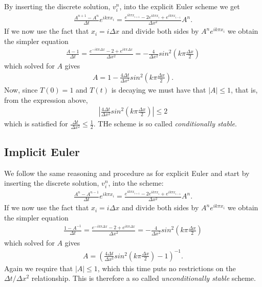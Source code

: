 \documentclass[11pt,a4paper,draft]{article}
\numberwithin{equation}{section}
\begin{document}
By inserting the discrete solution, $v^n_i$, into the explicit Euler scheme we get
\begin{align*}
\frac{A^{n+1}-A^{n}}{\Delta t} e^{ik \pi x_i} = \frac{e^{ik \pi x_{i+1}} -2e^{ik \pi x_i} + e^{ik \pi x_{i-1}}}{\Delta x^2} A^n.
\end{align*}
If we now use the fact that $x_i = i\Delta x$ and divide both sides by $A^n e^{ik \pi x_i}$ we obtain the simpler equation
\begin{align*}
\frac{A-1}{\Delta t} = \frac{e^{-ik \pi \Delta x} -2 + e^{ik \pi \Delta x}}{\Delta x^2} = -\frac{4}{\Delta x^2}sin^2\left(k\pi \frac{\Delta x}{2}\right)
\end{align*}
which solved for $A$ gives
\begin{align*}
A=1-\frac{4\Delta t}{\Delta x^2}sin^2\left(k\pi \frac{\Delta x}{2}\right).
\end{align*}
Now, since $T(0)=1$ and $T(t)$ is decaying we must have that $|A| \leq 1$, that is, from the expression above, 
\begin{align*}
|\frac{4\Delta t}{\Delta x^2}sin^2\left(k\pi \frac{\Delta x}{2}\right)| \leq 2
\end{align*} 
which is satisfied for $\frac{\Delta t}{\Delta x^2} \leq \frac{1}{2}$. THe scheme is so called \emph{conditionally stable}.

\subsection{Implicit Euler}
We follow the same reasoning and procedure as for explicit Euler and start by inserting the discrete solution, $v^n_i$, into the scheme:
\begin{align*}
\frac{A^{n}-A^{n-1}}{\Delta t} e^{ik \pi x_i} = \frac{e^{ik \pi x_{i+1}} -2e^{ik \pi x_i} + e^{ik \pi x_{i-1}}}{\Delta x^2} A^n.
\end{align*}
If we now use the fact that $x_i = i\Delta x$ and divide both sides by $A^n e^{ik \pi x_i}$ we obtain the simpler equation
\begin{align*}
\frac{1-A^{-1}}{\Delta t} = \frac{e^{-ik \pi \Delta x} -2 + e^{ik \pi \Delta x}}{\Delta x^2} = -\frac{4}{\Delta x^2}sin^2\left(k\pi \frac{\Delta x}{2}\right)
\end{align*}
which solved for $A$ gives
\begin{align*}
A=\left( \frac{4\Delta t}{\Delta x^2}sin^2\left(k\pi \frac{\Delta x}{2}\right)-1 \right)^{-1}.
\end{align*}
Again we require that $|A| \leq 1$, which this time puts no restrictions on the $\Delta t/ \Delta x^2$ relationship. This is therefore a so called \emph{unconditionally stable} scheme.
\end{document}
